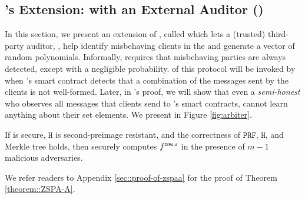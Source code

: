 



\vs
\vs



\subsection{\zspa's Extension: \zspa with an External Auditor (\zspaa)}

In this section, we present an extension of \zspa, called \zspaa which lets a (trusted) third-party auditor, \aud, help identify misbehaving clients in the \zspa and generate a vector of random polynomials. Informally, \zspaa requires that misbehaving parties are always detected, except with a negligible probability. \aud of this protocol will be invoked by \withFai when \withFai's smart contract detects that a combination of the messages sent by the clients is not well-formed. Later, in \withFai's proof, we will show that even a \emph{semi-honest} \aud who observes all messages that clients send to \withFai's smart contracts, cannot learn anything about their set elements. We present \zspaa in Figure \ref{fig:arbiter}. 




\vs

\begin{theorem}\label{theorem::ZSPA-A}
If \zspa is secure, $\mathtt{H}$ is second-preimage resistant, and the correctness of $\mathtt{PRF}$, $\mathtt{H}$, and Merkle tree holds,  then \zspaa securely computes $f^{\scriptscriptstyle \mathtt{ZSPA\text{-}A}}$ in the presence of $m-1 $ malicious adversaries.%
\end{theorem}

We refer readers to Appendix \ref{sec::proof-of-zspaa} for the proof of Theorem \ref{theorem::ZSPA-A}. 






